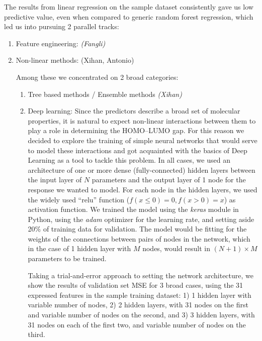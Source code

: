 \documentclass[11pt]{article}
\begin{document}
The results from linear regression on the sample dataset consistently gave us low predictive value, even when compared to generic random forest regression, which led us into pursuing 2 parallel tracks:

\begin{enumerate}

\item Feature engineering: \emph{(Fangli)}

\item Non-linear methods: (Xihan, Antonio)

Among these we concentrated on 2 broad categories:

\begin{enumerate}

\item Tree based methods / Ensemble methods \emph{(Xihan)}

\item Deep learning: Since the predictors describe a broad set of molecular properties, it is natural to expect non-linear interactions between them to play a role in determining the HOMO--LUMO gap. For this reason we decided to explore the training of simple neural networks that would serve to model these interactions and got acquainted with the basics of Deep Learning as a tool to tackle this problem. In all cases, we used an architecture of one or more dense (fully-connected) hidden layers between the input layer of $N$ parameters and the output layer of 1 node for the response we wanted to model. For each node in the hidden layers, we used the widely used ``relu'' function ($f(x \le 0) = 0, f(x > 0) = x$) as activation function. We trained the model using the \emph{keras} module in Python, using the \emph{adam} optimizer for the learning rate, and setting aside 20\% of training data for validation. The model would be fitting for the weights of the connections between pairs of nodes in the network, which in the case of 1 hidden layer with $M$ nodes, would result in $(N + 1) \times M$ parameters to be trained.

Taking a trial-and-error approach to setting the network architecture, we show the results of validation set MSE for 3 broad cases, using the 31 expressed features in the sample training dataset: 1) 1 hidden layer with variable number of nodes, 2) 2 hidden layers, with 31 nodes on the first and variable number of nodes on the second, and 3) 3 hidden layers, with 31 nodes on each of the first two, and variable number of nodes on the third.


\end{enumerate}
\end{enumerate}
\end{document}
